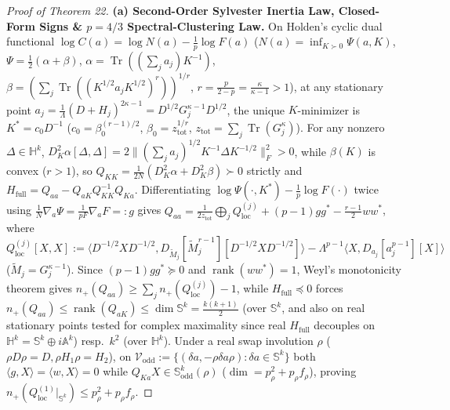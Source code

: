 \documentclass[10pt,letterpaper]{article}
\newcommand{\Tr}{\operatorname{Tr}}
\newcommand{\rank}{\operatorname{rank}}
\begin{document}
\begin{proof}[Proof of Theorem 22]
\textbf{(a) Second-Order Sylvester Inertia Law, Closed-Form Signs \& $p = 4/3$ Spectral-Clustering Law.}
On Holden's cyclic dual functional $\log C(a) = \log N(a) - \frac{1}{p}\log F(a)$ ($N(a) = \inf_{K \succ 0}\Psi(a, K)$, $\Psi = \frac{1}{2}(\alpha + \beta)$, $\alpha = \Tr((\sum_j a_j)K^{-1})$, $\beta = (\sum_j\Tr((K^{1/2} a_j K^{1/2})^r))^{1/r}$, $r = \frac{p}{2-p} = \frac{\kappa}{\kappa-1} > 1$), at any stationary point $a_j = \frac{1}{\Lambda}(D+H_j)^{2\kappa-1} = D^{1/2} G_j^{\kappa-1} D^{1/2}$, the unique $K$-minimizer is $K^* = c_0 D^{-1}$ ($c_0 = \beta_0^{(r-1)/2}$, $\beta_0 = z_{\mathrm{tot}}^{1/r}$, $z_{\mathrm{tot}} = \sum_j \Tr(G_j^\kappa)$). For any nonzero $\Delta \in \mathbb{H}^k$, $D^2_K\alpha[\Delta,\Delta] = 2\|(\sum_j a_j)^{1/2} K^{-1}\Delta K^{-1/2}\|_F^2 > 0$, while $\beta(K)$ is convex ($r > 1$), so $Q_{KK} = \frac{1}{2N}(D^2_K\alpha + D^2_K\beta) \succ 0$ strictly and $H_{\mathrm{full}} = Q_{aa} - Q_{aK}Q_{KK}^{-1}Q_{Ka}$. Differentiating $\log\Psi(\cdot, K^*) - \frac{1}{p}\log F(\cdot)$ twice using $\frac{1}{N}\nabla_a\Psi = \frac{1}{pF}\nabla_a F =: g$ gives $Q_{aa} = \frac{1}{2z_{\mathrm{tot}}}\bigoplus_j Q_{\mathrm{loc}}^{(j)} + (p-1)gg^* - \frac{r-1}{2}ww^*$, where $Q_{\mathrm{loc}}^{(j)}[X,X] := \langle D^{-1/2} X D^{-1/2}, D_{\widetilde{M}_j}[\widetilde{M}_j^{r-1}][D^{-1/2} X D^{-1/2}]\rangle - \Lambda^{p-1}\langle X, D_{a_j}[a_j^{p-1}][X]\rangle$ ($\widetilde{M}_j = G_j^{\kappa-1}$). Since $(p-1)gg^* \succeq 0$ and $\rank(ww^*) = 1$, Weyl's monotonicity theorem gives $n_+(Q_{aa}) \ge \sum_j n_+(Q_{\mathrm{loc}}^{(j)}) - 1$, while $H_{\mathrm{full}} \preceq 0$ forces $n_+(Q_{aa}) \le \rank(Q_{aK}) \le \dim\mathbb{S}^k = \frac{k(k+1)}{2}$ (over $\mathbb{S}^k$, and also on real stationary points tested for complex maximality since real $H_{\mathrm{full}}$ decouples on $\mathbb{H}^k = \mathbb{S}^k \oplus i\mathbb{A}^k$) resp.\ $k^2$ (over $\mathbb{H}^k$). Under a real swap involution $\rho$ ($\rho D\rho = D, \rho H_1\rho = H_2$), on $\mathcal{V}_{\mathrm{odd}} := \{(\delta a, -\rho\delta a\rho) : \delta a \in \mathbb{S}^k\}$ both $\langle g, X\rangle = \langle w, X\rangle = 0$ while $Q_{Ka} X \in \mathbb{S}^k_{\mathrm{odd}}(\rho)$ ($\dim = p_\rho^2 + p_\rho f_\rho$), proving $n_+(Q_{\mathrm{loc}}^{(1)}|_{\mathbb{S}^k}) \le p_\rho^2 + p_\rho f_\rho$.


\end{proof}
\end{document}
